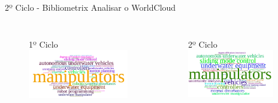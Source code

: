 \begin{frame}{2º Ciclo - Bibliometrix}
	Analisar o WorldCloud
	\begin{columns}
		\begin{figure}[hb]
      1º Ciclo
			\includegraphics[width=1\textwidth]{figures/worldold.png}
		\end{figure}
		\begin{figure}[ht]
      2º Ciclo
      \includegraphics[width=0.9\textwidth]{figures/worldnovo.png}
		\end{figure}
	\end{columns}
\end{frame}

